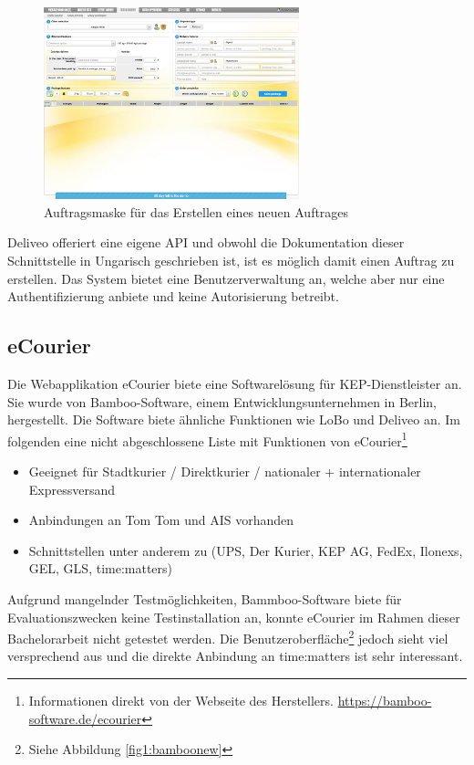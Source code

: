 \begin{figure}[ht]
	\centering
  \includegraphics[width=0.66\textwidth]{images/deliveoNew.png}
	\caption{Auftragsmaske für das Erstellen eines neuen Auftrages}
	\label{fig1:deliveonew}
\end{figure}

Deliveo offeriert eine eigene API und obwohl die Dokumentation dieser Schnittstelle in Ungarisch geschrieben ist, ist es möglich damit einen Auftrag zu erstellen. Das System bietet eine Benutzerverwaltung an, welche aber nur eine Authentifizierung anbiete und keine Autorisierung betreibt.

\subsection{eCourier}
Die Webapplikation eCourier biete eine Softwarelösung für KEP-Dienstleister an. Sie wurde von Bamboo-Software, einem Entwicklungsunternehmen in Berlin, hergestellt. Die Software biete ähnliche Funktionen wie LoBo und Deliveo an. Im folgenden eine nicht abgeschlossene Liste mit Funktionen von eCourier\footnote{ Informationen direkt von der Webseite des Herstellers. \url{https://bamboo-software.de/ecourier}}
\begin{itemize}
	\item Geeignet für Stadtkurier / Direktkurier / nationaler + internationaler Expressversand
	\item Anbindungen an Tom Tom und AIS vorhanden
	\item Schnittstellen unter anderem zu (UPS, Der Kurier, KEP AG, FedEx, Ilonexs, GEL, GLS, time:matters)
\end{itemize}
Aufgrund mangelnder Testmöglichkeiten, Bammboo-Software biete für Evaluationszwecken keine Testinstallation an, konnte eCourier im Rahmen dieser Bachelorarbeit nicht getestet werden. Die Benutzeroberfläche\footnote{Siehe Abbildung \ref{fig1:bamboonew}} jedoch sieht viel versprechend aus und die direkte Anbindung an time:matters ist sehr interessant.

